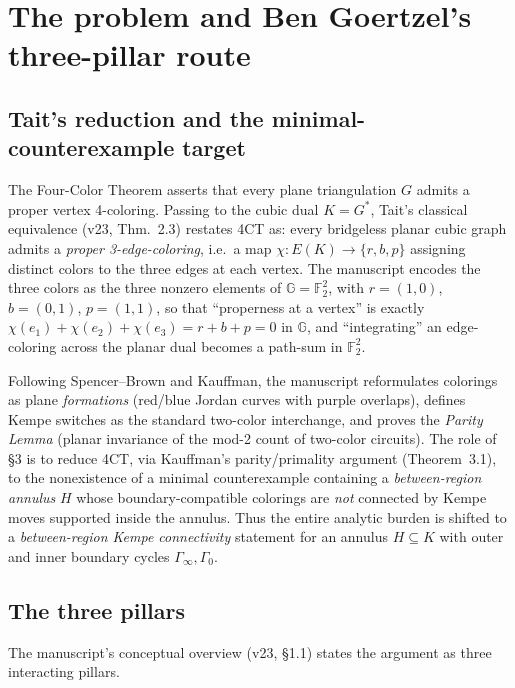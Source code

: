\documentclass[11pt]{article}
\theoremstyle{definition}
\newcommand{\GG}{\mathbb{G}}
\newcommand{\FF}{\mathbb{F}_2}
\newcommand{\colorset}{\{r,b,p\}}
\begin{document}
\section{The problem and Ben Goertzel's three-pillar route}
\label{sec:problem}

\subsection{Tait's reduction and the minimal-counterexample target}

The Four-Color Theorem asserts that every plane triangulation $G$ admits a
proper vertex 4-coloring. Passing to the cubic dual $K=G^{*}$, Tait's classical
equivalence (v23, Thm.~2.3) restates 4CT as: every bridgeless planar cubic
graph admits a \emph{proper 3-edge-coloring}, i.e.\ a map
$\chi:E(K)\to\colorset$ assigning distinct colors to the three edges at each
vertex. The manuscript encodes the three colors as the three nonzero elements
of $\GG=\FF^{2}$, with $r=(1,0)$, $b=(0,1)$, $p=(1,1)$, so that ``properness at
a vertex'' is exactly $\chi(e_1)+\chi(e_2)+\chi(e_3)=r+b+p=0$ in $\GG$, and
``integrating'' an edge-coloring across the planar dual becomes a path-sum in
$\FF^{2}$.

Following Spencer--Brown and Kauffman, the manuscript reformulates colorings as
plane \emph{formations} (red/blue Jordan curves with purple overlaps), defines
Kempe switches as the standard two-color interchange, and proves the
\emph{Parity Lemma} (planar invariance of the mod-2 count of two-color
circuits). The role of \S3 is to reduce 4CT, via Kauffman's parity/primality
argument (Theorem~3.1), to the nonexistence of a minimal counterexample
containing a \emph{between-region annulus} $H$ whose boundary-compatible
colorings are \emph{not} connected by Kempe moves supported inside the annulus.
Thus the entire analytic burden is shifted to a \emph{between-region Kempe
connectivity} statement for an annulus $H\subseteq K$ with outer and inner
boundary cycles $\Gamma_\infty,\Gamma_0$.

\subsection{The three pillars}

The manuscript's conceptual overview (v23, \S1.1) states the argument as three
interacting pillars.
\end{document}
